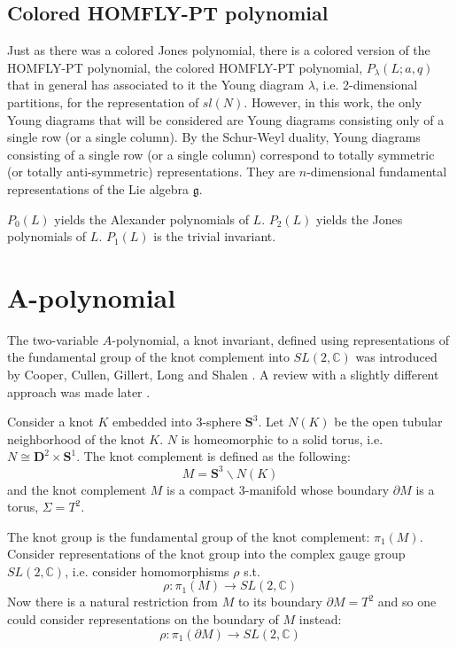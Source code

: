 \documentclass[a4paper,titlepage,twoside]{book}
\begin{document}
\subsection{Colored HOMFLY-PT polynomial}

Just as there was a colored Jones polynomial, there is a colored version of the HOMFLY-PT polynomial, the colored HOMFLY-PT polynomial, $P_{\lambda}{(L;a,q)}$ that in general has associated to it the Young diagram $\lambda$, i.e. 2-dimensional partitions, for the representation of $sl{(N)}$.  However, in this work, the only Young diagrams that will be considered are Young diagrams consisting only of a single row (or a single column).  By the Schur-Weyl duality, Young diagrams consisting of a single row (or a single column) correspond to totally symmetric (or totally anti-symmetric) representations.  They are $n$-dimensional fundamental representations of the Lie algebra $\mathfrak{g}$.  

$P_0{(L)}$ yields the Alexander polynomials of $L$.  $P_2{(L)}$ yields the Jones polynomials of $L$.  $P_1{(L)}$ is the trivial invariant.  

\section{A-polynomial}  \label{Sec:Apolynomial}

The two-variable $A$-polynomial, a knot invariant, defined using representations of the fundamental group of the knot complement into $SL{(2,\mathbb{C})}$ was introduced by Cooper, Cullen, Gillert, Long and Shalen \cite{CooperCullerGillertLongShalen1994}.  A review with a slightly different approach was made later \cite{CooperLong1996}.  

Consider a knot $K$ embedded into 3-sphere $\mathbf{S}^3$.  Let $N(K)$ be the open tubular neighborhood of the knot $K$.  $N$ is homeomorphic to a solid torus, i.e. $N \cong \mathbf{D}^2 \times \mathbf{S}^1$.  The knot complement is defined as the following:
\begin{equation}
  M = \mathbf{S}^3 \backslash N(K)
\end{equation}
and the knot complement $M$ is a compact 3-manifold whose boundary $\partial M$ is a torus, $\Sigma = T^2$.  

The knot group is the fundamental group of the knot complement: $\pi_1(M)$.  Consider representations of the knot group into the complex gauge group $SL{(2,\mathbb{C})}$, i.e. consider homomorphisms $\rho$ s.t.
\[
\rho: \pi_1(M) \to SL{(2,\mathbb{C})}
\]
Now there is a natural restriction from $M$ to its boundary $\partial M = T^2$ and so one could consider representations on the boundary of $M$ instead:
\[
\rho:\pi_1(\partial M) \to SL{(2,\mathbb{C})}
\]
\end{document}
